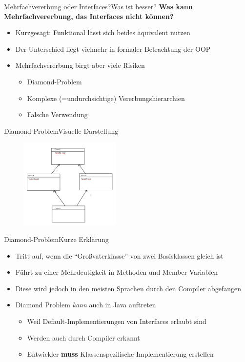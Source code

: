 \begin{frame}{Mehrfachvererbung oder Interfaces?}{Was ist besser?}
\textbf{Was kann Mehrfachvererbung, das Interfaces nicht können?}
    \begin{itemize}[<+->]
        \item Kurzgesagt: Funktional lässt sich beides äquivalent nutzen
        \item Der Unterschied liegt vielmehr in formaler Betrachtung der OOP
        \item Mehrfachvererbung birgt aber viele Risiken
        \begin{itemize}
            \item Diamond-Problem
            \item Komplexe (=undurchsichtige) Vererbungshierarchien
            \item Falsche Verwendung
        \end{itemize}
    \end{itemize}
\end{frame}

\begin{frame}{Diamond-Problem}{Visuelle Darstellung}
    \begin{figure}
        \centering
        \includegraphics[height=4.5cm]{graph/diamond}
    \end{figure}
\end{frame}

\begin{frame}{Diamond-Problem}{Kurze Erklärung}
    \begin{itemize}
        \item Tritt auf, wenn die "`Großvaterklasse"' von zwei Basisklassen gleich ist
        \item Führt zu einer Mehrdeutigkeit in Methoden und Member Variablen
        \item Diese wird jedoch in den meisten Sprachen durch den Compiler abgefangen
        \item Diamond Problem \textit{kann} auch in Java auftreten
        \begin{itemize}
            \item Weil Default-Implementierungen von Interfaces erlaubt sind
            \item Werden auch durch Compiler erkannt
            \item Entwickler \textbf{muss} Klassenspezifische Implementierung erstellen
        \end{itemize}
    \end{itemize}
\end{frame}

